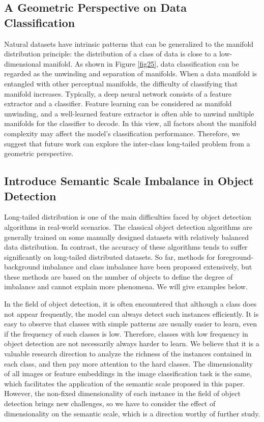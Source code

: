 \documentclass[10pt]{article} %
\begin{document}
\subsection{A Geometric Perspective on Data Classification\label{J.2}}

Natural datasets have intrinsic patterns that can be generalized to the manifold distribution principle: the distribution of a class of data is close to a low-dimensional manifold. As shown in Figure \ref{fig25}, data classification can be regarded as the unwinding and separation of manifolds. When a data manifold is entangled with other perceptual manifolds, the difficulty of classifying that manifold increases. Typically, a deep neural network consists of a feature extractor and a classifier. Feature learning can be considered as manifold unwinding, and a well-learned feature extractor is often able to unwind multiple manifolds for the classifier to decode. In this view, all factors about the manifold complexity may affect the model's classification performance. Therefore, we suggest that future work can explore the inter-class long-tailed problem from a geometric perspective.


\subsection{Introduce Semantic Scale Imbalance in Object Detection\label{J.3}}

Long-tailed distribution is one of the main difficulties faced by object detection algorithms in real-world scenarios. The classical object detection algorithms are generally trained on some manually designed datasets with relatively balanced data distribution. In contrast, the accuracy of these algorithms tends to suffer significantly on long-tailed distributed datasets. So far, methods for foreground-background imbalance and class imbalance have been proposed extensively, but these methods are based on the number of objects to define the degree of imbalance and cannot explain more phenomena. We will give examples below.

In the field of object detection, it is often encountered that although a class does not appear frequently, the model can always detect such instances efficiently. It is easy to observe that classes with simple patterns are usually easier to learn, even if the frequency of such classes is low. Therefore, classes with low frequency in object detection are not necessarily always harder to learn. We believe that it is a valuable research direction to analyze the richness of the instances contained in each class, and then pay more attention to the hard classes. The dimensionality of all images or feature embeddings in the image classification task is the same, which facilitates the application of the semantic scale proposed in this paper. However, the non-fixed dimensionality of each instance in the field of object detection brings new challenges, so we have to consider the effect of dimensionality on the semantic scale, which is a direction worthy of further study.
\end{document}
